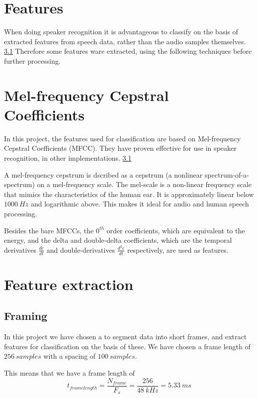 \section{Features}

When doing speaker recognition it is advantageous to classify on the basis of extracted features from speech data, rather than the audio samples themselves. \ref{} %
Therefore some features ware extracted, using the following techniques before further processing.

\section{Mel-frequency Cepstral Coefficients}
In this project, the features used for classification are based on Mel-frequency Cepstral Coefficients (MFCC).
They have proven effective for use in speaker recognition, in other implementations. \ref{}  %

A mel-frequency cepstrum is dscribed as a cepstrum (a nonlinear spectrum-of-a-spectrum) on a mel-frequency scale.
The mel-scale is a non-linear frequency scale that mimics the characteristics of the human ear.
It is approximately linear below $ 1000\ Hz $ and logarithmic above.
This makes it ideal for audio and human speech processing.

Besides the bare MFCCs, the $ 0^{th} $ order coefficients, which are equivalent to the energy, and the delta and double-delta coefficients, which are the temporal derivatives $ \frac{dc}{dt} $ and double-derivatives $\frac{d^2c}{dt}$ respectively, are used as features.


\section{Feature extraction}
\subsection{Framing}
In this project we have chosen a to segment data into short frames, and extract features for classification on the basis of these.
We have chosen a frame length of $ 256\ samples $ with a spacing of $ 100\ samples $.

This means that we have a frame length of
\begin{equation}
t_{frame length} = \dfrac{N_{frame}}{F_s} = \dfrac{256}{48\ kHz} = 5.33\ ms
\end{equation}

